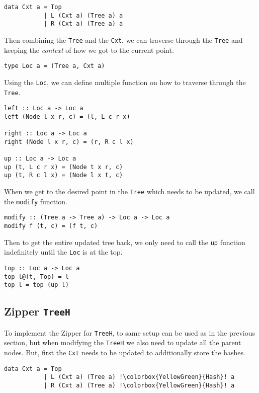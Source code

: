 \begin{verbatim}
data Cxt a = Top
           | L (Cxt a) (Tree a) a
           | R (Cxt a) (Tree a) a
\end{verbatim}

Then combining the \texttt{Tree} and the \texttt{Cxt}, we can traverse through the \texttt{Tree} and keeping the \textit{context} of how we got to the current point.

\begin{verbatim}
type Loc a = (Tree a, Cxt a)
\end{verbatim}

Using the \texttt{Loc}, we can define multiple function on how to traverse through the \texttt{Tree}.

\begin{verbatim}
left :: Loc a -> Loc a
left (Node l x r, c) = (l, L c r x)

right :: Loc a -> Loc a
right (Node l x r, c) = (r, R c l x)

up :: Loc a -> Loc a
up (t, L c r x) = (Node t x r, c)
up (t, R c l x) = (Node l x t, c)
\end{verbatim}

When we get to the desired point in the \texttt{Tree} which needs to be updated, we call the \texttt{modify} function.

\begin{verbatim}
modify :: (Tree a -> Tree a) -> Loc a -> Loc a
modify f (t, c) = (f t, c)
\end{verbatim}

Then to get the entire updated tree back, we only need to call the \texttt{up} function indefinitely until the \texttt{Loc} is at the top.

\begin{verbatim}
top :: Loc a -> Loc a
top l@(t, Top) = l
top l = top (up l)
\end{verbatim}

\newpage
\subsection{Zipper \texttt{TreeH}}

To implement the Zipper for \texttt{TreeH}, to same setup can be used as in the previous section, but when modifying the \texttt{TreeH} we also need to update all the parent nodes. But, first the \texttt{Cxt} needs to be updated to additionally store the hashes.

\begin{verbatim}
data Cxt a = Top
           | L (Cxt a) (Tree a) !\colorbox{YellowGreen}{Hash}! a
           | R (Cxt a) (Tree a) !\colorbox{YellowGreen}{Hash}! a
\end{verbatim}

% 
